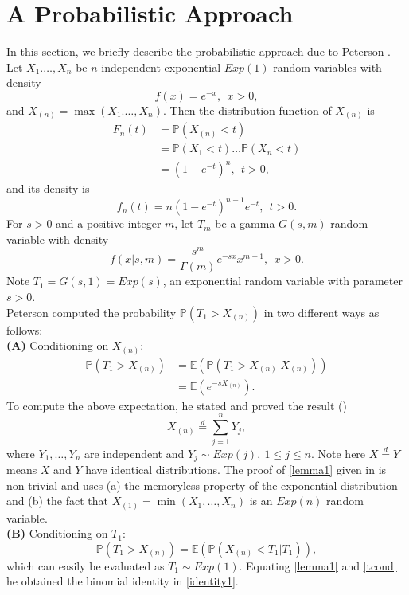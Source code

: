 \documentclass[11pt]{amsart}
\numberwithin{equation}{section}
\begin{document}
\section{A Probabilistic Approach}
In this section, we briefly describe the probabilistic approach due to Peterson \cite{peter}. Let $X_{1}.\ldots,X_{n}$ be $n$ independent exponential $Exp(1)$ random variables with density 
\begin{equation*}
 f(x)=e^{-x},~~x>0,
\end{equation*}
and $X_{(n)}=\max(X_{1}.\ldots,X_{n})$. Then the distribution function of $X_{(n)}$ is 
\begin{align}
 F_{n}(t)&=\mathbb{P}(X_{(n)}<t)\nonumber\\
 &=\mathbb{P}(X_{1}<t)\ldots\mathbb{P}(X_{n}<t)\nonumber\\
 &=(1-e^{-t})^{n},~~t>0,\label{exp-dist}
\end{align}
and its density is 
\begin{equation}\label{density2}
 f_{n}(t)=n(1-e^{-t})^{n-1}e^{-t},~~t>0.
\end{equation}
For $s>0$ and a positive integer $m$, let $T_{m}$ be a gamma $G(s,m)$ random variable with density 
\begin{equation*}
 f(x|s,m)=\frac{s^{m}}{\Gamma(m)}e^{-sx}x^{m-1},~~x>0.
\end{equation*}
Note $T_{1}=G(s,1)=Exp(s)$, an exponential random variable with parameter ${s}> 0$.\vspace{0.1cm}\\
Peterson \cite{peter} computed the probability $\mathbb{P}(T_{1}>X_{(n)})$ in two different ways as follows:\vspace{0.1cm}\\ 
{\bf(A)} Conditioning on $X_{(n)}$:
\begin{align*}
 \mathbb{P}(T_{1}>X_{(n)})&=\mathbb{E}(\mathbb{P}(T_{1}>X_{(n)}|X_{(n)}))\nonumber\\
 &=\mathbb{E}(e^{-sX_{(n)}}).
\end{align*}
To compute the above expectation, he stated and proved the result (\cite[Lemma 1]{peter})
\begin{equation}\label{lemma1}
 X_{(n)}\stackrel{d}{=}\sum_{j=1}^{n}Y_{j},
\end{equation}
where $Y_{1},\ldots, Y_{n}$ are independent and $Y_{j}\sim Exp(j),~1\leq j\leq n.$ Note here $X\stackrel{d}{=}Y$ means $X$ and $Y$ have identical distributions. The proof of \eqref{lemma1} given in \cite{peter} is non-trivial and uses (a) the memoryless property of the exponential distribution and (b) the fact that $X_{(1)}=\min(X_{1},\ldots,X_{n})$ is an $Exp(n)$ random variable.\vspace{0.1cm}\\
{\bf(B)} Conditioning on $T_1$:
\begin{equation}\label{tcond}
 \mathbb{P}(T_1>X_{(n)})=\mathbb{E}(\mathbb{P}(X_{(n)}<T_{1}|T_{1})),
\end{equation}
which can easily be evaluated as $T_{1}\sim Exp(1)$. Equating \eqref{lemma1} and \eqref{tcond} he obtained the binomial identity in \eqref{identity1}.
\end{document}
